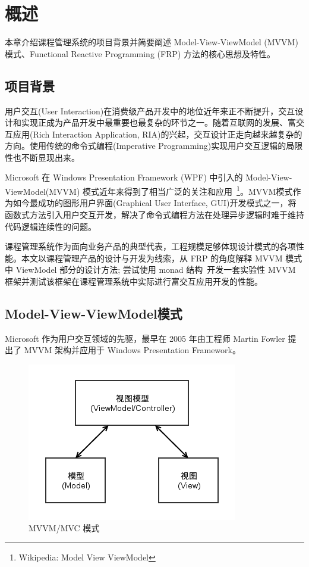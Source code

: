 \chapter{概述}

本章介绍课程管理系统的项目背景并简要阐述 Model-View-ViewModel (MVVM) 模式、Functional Reactive Programming (FRP) 方法的核心思想及特性。

\section{项目背景}

用户交互(User Interaction)在消费级产品开发中的地位近年来正不断提升，交互设计和实现正成为产品开发中最重要也最复杂的环节之一。随着互联网的发展、富交互应用(Rich Interaction Application, RIA)的兴起，交互设计正走向越来越复杂的方向。使用传统的命令式编程(Imperative Programming)实现用户交互逻辑的局限性也不断显现出来。

Microsoft 在 Windows Presentation Framework (WPF) 中引入的 Model-View-ViewModel(MVVM) 模式近年来得到了相当广泛的关注和应用~\footnote{Wikipedia: Model View ViewModel}。MVVM模式作为如今最成功的图形用户界面(Graphical User Interface, GUI)开发模式之一，将函数式方法引入用户交互开发，解决了命令式编程方法在处理异步逻辑时难于维持代码逻辑连续性的问题。

课程管理系统作为面向业务产品的典型代表，工程规模足够体现设计模式的各项性能。本文以课程管理产品的设计与开发为线索，从 FRP 的角度解释 MVVM 模式中 ViewModel 部分的设计方法; 尝试使用 monad 结构~\cite{raey}开发一套实验性 MVVM 框架并测试该框架在课程管理系统中实际进行富交互应用开发的性能。

\section{Model-View-ViewModel模式}

Microsoft 作为用户交互领域的先驱，最早在 2005 年由工程师 Martin Fowler 提出了 MVVM 架构并应用于 Windows Presentation Framework。

\begin{figure}[!hbp]
\begin{center}
\includegraphics[scale=0.5]{figures/MVVMOverview.png}
\caption{MVVM/MVC 模式\label{MVVMOverview}}
\end{center}
\end{figure}

